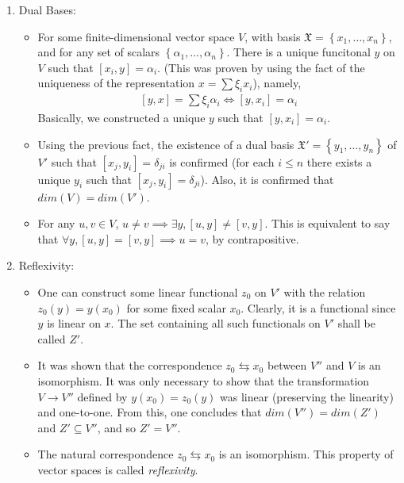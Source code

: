\documentclass[12pt]{article}
\newcommand{\mf}[1]{\mathfrak{#1}}
\begin{document}
\begin{enumerate}
  \item Dual Bases:\\
\begin{itemize}
  \item For some finite-dimensional vector space $V$, with basis $\mf{X}=\left\{ x_{1},\dots,x_{n} \right\}$, and for any set of scalars $\left\{ \alpha_{1},\dots,\alpha_{n} \right\}$. There is a unique funcitonal $y$ on $V$ such that $\left[ x_{i},y \right] = \alpha_{i}$. (This was proven by using the fact of the uniqueness of the representation $x=\sum \xi_{i}x_{i}$), namely, 
\begin{align*}
  \left[y,x\right]=\sum\xi_{i}\alpha_{i} \iff \left[y,x_{i}\right]=\alpha_{i}
\end{align*}
Basically, we constructed a unique $y$ such that $\left[ y,x_{i} \right]=\alpha_{i}$.
\item Using the previous fact, the existence of a dual basis $\mf{X}'=\left\{ y_{1},\dots,y_{n} \right\}$ of $V'$ such that $\left[ x_{j},y_{i} \right]=\delta_{ji}$ is confirmed (for each $i\leq n$ there exists a unique $y_{i}$ such that $\left[ x_{j},y_{i} \right]=\delta_{ji}$). Also, it is confirmed that $dim(V) = dim(V')$.
\item For any $u,v\in V$, $u\neq v \implies \exists y, [u,y]\neq [v,y]$. This is equivalent to say that $\forall y, [u,y]=[v,y]\implies u=v$, by contrapositive.
\end{itemize}
\item Reflexivity:\\
\begin{itemize}
  \item One can construct some linear functional $z_{0}$ on $V'$ with the relation $z_{0}(y) = y(x_{0})$ for some fixed scalar $x_{0}$. Clearly, it is a functional since $y$ is linear on $x$. The set containing all such functionals on $V'$ shall be called $Z'$.
  \item It was shown that the correspondence $z_{0}\leftrightarrows x_{0}$ between $V''$ and $V$ is an isomorphism. It was only necessary to show that the transformation $V\to V''$ defined by $y(x_{0}) = z_{0}(y)$ was linear (preserving the linearity) and one-to-one. From this, one concludes that $dim(V'')=dim(Z')$ and $Z'\subseteq V''$, and so $Z'=V''$.
  \item The natural correspondence $z_{0}\leftrightarrows x_{0}$ is an isomorphism. This property of vector spaces is called \textit{reflexivity}.
\end{itemize}
\end{enumerate}
\end{document}
